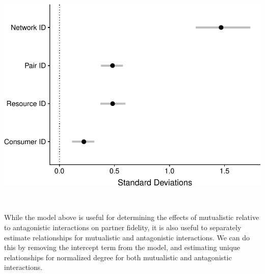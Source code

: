\documentclass[11pt,]{article}
\let\origfigure\figure
\let\endorigfigure\endfigure
\renewenvironment{figure}[1][2] {
    \expandafter\origfigure\expandafter[H]
} {
    \endorigfigure
}
\begin{document}
\begin{figure}

{\centering \includegraphics[width=0.75\linewidth]{reproduce_analyses_files/figure-latex/full-table-random-plot-1} 

}

\caption{Mean and 95\% credible intervals of random effects from our full model.}\label{fig:full-table-random-plot}
\end{figure}

~

While the model above is useful for determining the effects of
mutualistic relative to antagonistic interactions on partner fidelity,
it is also useful to separately estimate relationships for mutualistic
and antagonistic interactions. We can do this by removing the intercept
term from the model, and estimating unique relationships for normalized
degree for both mutualistic and antagonistic interactions.
\end{document}
